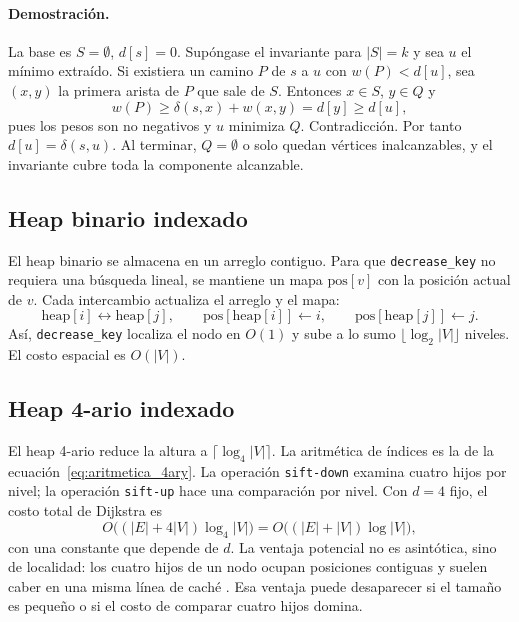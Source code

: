 \paragraph{Demostración.} La base es $S=\emptyset$, $d[s]=0$. Supóngase el invariante para $|S|=k$ y sea $u$ el mínimo extraído. Si existiera un camino $P$ de $s$ a $u$ con $w(P)<d[u]$, sea $(x,y)$ la primera arista de $P$ que sale de $S$. Entonces $x\in S$, $y\in Q$ y
\begin{equation}
    w(P)\ge \delta(s,x)+w(x,y)=d[y]\ge d[u],
\end{equation}
pues los pesos son no negativos y $u$ minimiza $Q$. Contradicción. Por tanto $d[u]=\delta(s,u)$. Al terminar, $Q=\emptyset$ o solo quedan vértices inalcanzables, y el invariante cubre toda la componente alcanzable.

\subsection{Heap binario indexado}
El heap binario se almacena en un arreglo contiguo. Para que \texttt{decrease\_key} no requiera una búsqueda lineal, se mantiene un mapa $\text{pos}[v]$ con la posición actual de $v$. Cada intercambio actualiza el arreglo y el mapa:
\begin{equation}
    \text{heap}[i]\leftrightarrow\text{heap}[j],\qquad
    \text{pos}[\text{heap}[i]]\leftarrow i,\qquad
    \text{pos}[\text{heap}[j]]\leftarrow j.
    \label{eq:swap}
\end{equation}
Así, \texttt{decrease\_key} localiza el nodo en $O(1)$ y sube a lo sumo $\lfloor\log_2 |V|\rfloor$ niveles. El costo espacial es $O(|V|)$.

\subsection{Heap 4-ario indexado}
El heap 4-ario reduce la altura a $\lceil\log_4|V|\rceil$. La aritmética de índices es la de la ecuación~\eqref{eq:aritmetica_4ary}. La operación \texttt{sift-down} examina cuatro hijos por nivel; la operación \texttt{sift-up} hace una comparación por nivel. Con $d=4$ fijo, el costo total de Dijkstra es
\begin{equation}
    O\bigl((|E|+4|V|)\log_4|V|\bigr)=O\bigl((|E|+|V|)\log|V|\bigr),
\end{equation}
con una constante que depende de $d$. La ventaja potencial no es asintótica, sino de localidad: los cuatro hijos de un nodo ocupan posiciones contiguas y suelen caber en una misma línea de caché \parencite{lamarca1996cache}. Esa ventaja puede desaparecer si el tamaño es pequeño o si el costo de comparar cuatro hijos domina.

